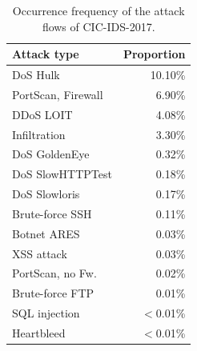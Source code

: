 \documentclass[conference]{IEEEtran}
\begin{document}
\begin{table}[h]
\caption{Occurrence frequency of the attack flows of CIC-IDS-2017.}
\label{tab:occurrence}
\centering
\begin{tabular}{l r}
\toprule
Attack type & \hspace*{-4mm}Proportion \\ \midrule
DoS Hulk	&	10.10\%	\\
PortScan, Firewall	&	6.90\%	\\
DDoS LOIT	&	4.08\%	\\
Infiltration	&	3.30\%	\\
DoS GoldenEye	&	0.32\%	\\
DoS SlowHTTPTest	&	0.18\%	\\
DoS Slowloris	&	0.17\%	\\
Brute-force SSH	&	0.11\%	\\
Botnet ARES	&	0.03\%	\\
XSS attack	&	0.03\%	\\
PortScan, no Fw.	&	0.02\%	\\
Brute-force FTP	&	0.01\%	\\
SQL injection	&	$<$0.01\%	\\
Heartbleed	&	$<$0.01\%	\\
\bottomrule
\end{tabular}
\end{table}
\end{document}
